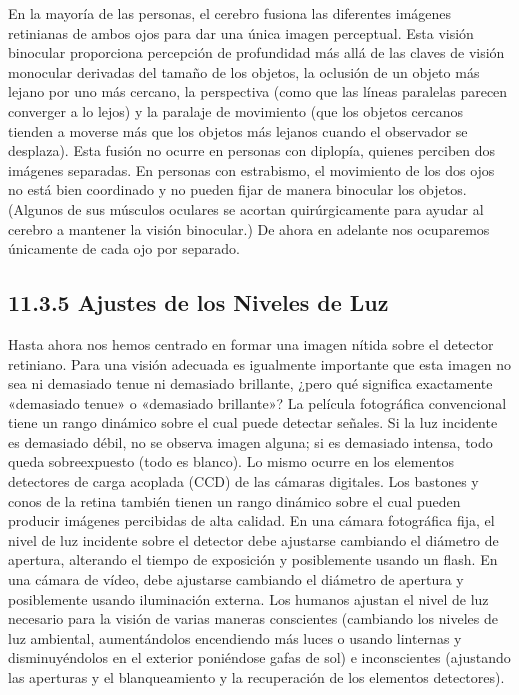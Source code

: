 \documentclass[12pt]{book}
\begin{document}
En la mayoría de las personas, el cerebro fusiona las diferentes imágenes retinianas de ambos ojos para dar una única imagen perceptual. Esta visión binocular proporciona percepción de profundidad más allá de las claves de visión monocular derivadas del tamaño de los objetos, la oclusión de un objeto más lejano por uno más cercano, la perspectiva (como que las líneas paralelas parecen converger a lo lejos) y la paralaje de movimiento (que los objetos cercanos tienden a moverse más que los objetos más lejanos cuando el observador se desplaza). Esta fusión no ocurre en personas con diplopía, quienes perciben dos imágenes separadas. En personas con estrabismo, el movimiento de los dos ojos no está bien coordinado y no pueden fijar de manera binocular los objetos. (Algunos de sus músculos oculares se acortan quirúrgicamente para ayudar al cerebro a mantener la visión binocular.) De ahora en adelante nos ocuparemos únicamente de cada ojo por separado.


\subsection{11.3.5 Ajustes de los Niveles de Luz}

Hasta ahora nos hemos centrado en formar una imagen nítida sobre el detector retiniano. Para una visión adecuada es igualmente importante que esta imagen no sea ni demasiado tenue ni demasiado brillante, ¿pero qué significa exactamente «demasiado tenue» o «demasiado brillante»? La película fotográfica convencional tiene un rango dinámico sobre el cual puede detectar señales. Si la luz incidente es demasiado débil, no se observa imagen alguna; si es demasiado intensa, todo queda sobreexpuesto (todo es blanco). Lo mismo ocurre en los elementos detectores de carga acoplada (CCD) de las cámaras digitales. Los bastones y conos de la retina también tienen un rango dinámico sobre el cual pueden producir imágenes percibidas de alta calidad. En una cámara fotográfica fija, el nivel de luz incidente sobre el detector debe ajustarse cambiando el diámetro de apertura, alterando el tiempo de exposición y posiblemente usando un flash. En una cámara de vídeo, debe ajustarse cambiando el diámetro de apertura y posiblemente usando iluminación externa. Los humanos ajustan el nivel de luz necesario para la visión de varias maneras conscientes (cambiando los niveles de luz ambiental, aumentándolos encendiendo más luces o usando linternas y disminuyéndolos en el exterior poniéndose gafas de sol) e inconscientes (ajustando las aperturas y el blanqueamiento y la recuperación de los elementos detectores).
\end{document}
